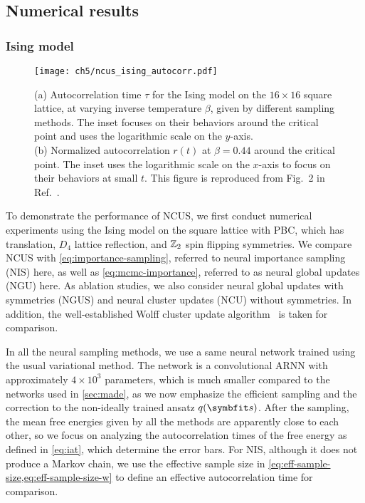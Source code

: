 \subsection{Numerical results}

\subsubsection{Ising model}

\begin{figure}[htb]
\centering
\texttt{[image: ch5/ncus\_ising\_autocorr.pdf]}
\caption[NCUS results of Ising model]{
(a) Autocorrelation time $\tau$ for the Ising model on the $16 \times 16$ square lattice, at varying inverse temperature $\beta$, given by different sampling methods.
The inset focuses on their behaviors around the critical point and uses the logarithmic scale on the $y$-axis. \\
(b) Normalized autocorrelation $r(t)$ at $\beta = 0.44$ around the critical point.
The inset uses the logarithmic scale on the $x$-axis to focus on their behaviors at small $t$.
This figure is reproduced from Fig.~2 in Ref.~\cite{wu2021unbiased}.
}
\label{fig:ncus-ising-autocorr}
\end{figure}

To demonstrate the performance of NCUS, we first conduct numerical experiments using the Ising model on the square lattice with PBC, which has translation, $D_4$ lattice reflection, and $\mathbb{Z}_2$ spin flipping symmetries. We compare NCUS with \cref{eq:importance-sampling}, referred to neural importance sampling (NIS) here, as well as \cref{eq:mcmc-importance}, referred to as neural global updates (NGU) here. As ablation studies, we also consider neural global updates with symmetries (NGUS) and neural cluster updates (NCU) without symmetries. In addition, the well-established Wolff cluster update algorithm~\cite{wolff1989collective} is taken for comparison.

In all the neural sampling methods, we use a same neural network trained using the usual variational method. The network is a convolutional ARNN with approximately $4 \times 10^3$ parameters, which is much smaller compared to the networks used in \cref{sec:made}, as we now emphasize the efficient sampling and the correction to the non-ideally trained ansatz $q(\vs)$. After the sampling, the mean free energies given by all the methods are apparently close to each other, so we focus on analyzing the autocorrelation times of the free energy as defined in \cref{eq:iat}, which determine the error bars. For NIS, although it does not produce a Markov chain, we use the effective sample size in \cref{eq:eff-sample-size,eq:eff-sample-size-w} to define an effective autocorrelation time for comparison.

